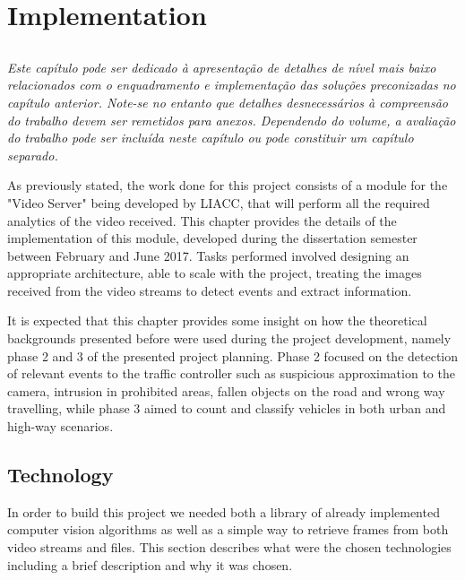 
\chapter{Implementation}\label{chap:chap4}
\listoftodos
\section*{}

\textit{
Este capítulo pode ser dedicado à apresentação de detalhes de nível
mais baixo relacionados com o enquadramento e implementação das
soluções preconizadas no capítulo anterior.
Note-se no entanto que detalhes desnecessários à compreensão do
trabalho devem ser remetidos para anexos.
Dependendo do volume, a avaliação do trabalho pode ser incluída neste
capítulo ou pode constituir um capítulo separado.
}


As previously stated, the work done for this project consists of a module for the "Video Server" being developed by LIACC, that will perform all the required analytics of the video received. This chapter provides the details of the implementation of this module, developed during the dissertation semester between February and June 2017. Tasks performed involved designing an appropriate architecture, able to scale with the project, treating the images received from the video streams to detect events and extract information. 

It is expected that this chapter provides some insight on how the theoretical backgrounds presented before were used during the project development, namely phase 2 and 3 of the presented project planning. Phase 2 focused on the detection of relevant events to the traffic controller such as suspicious approximation to the camera, intrusion in prohibited areas, fallen objects on the road and wrong way travelling, while phase 3 aimed to count and classify vehicles in both urban and high-way scenarios.

\section{Technology}

In order to build this project we needed both a library of already implemented computer vision algorithms as well as a simple way to retrieve frames from both video streams and files. This section describes what were the chosen technologies including a brief description and why it was chosen.

